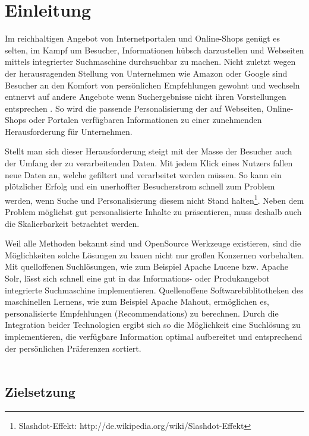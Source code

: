 \section{Einleitung}

Im reichhaltigen Angebot von Internetportalen und Online-Shops genügt es selten, im Kampf um Besucher, Informationen hübsch darzustellen und Webseiten mittels integrierter Suchmaschine durchsuchbar zu machen. Nicht zuletzt wegen der herausragenden Stellung von Unternehmen wie Amazon oder Google sind Besucher an den Komfort von persönlichen Empfehlungen gewohnt und wechseln entnervt auf andere Angebote wenn Suchergebnisse nicht ihren Vorstellungen entsprechen \citep[Kap 10]{hb,rs}. So wird die passende Personalisierung der auf Webseiten, Online-Shops oder Portalen verfügbaren Informationen zu einer zunehmenden Herausforderung für Unternehmen.

Stellt man sich dieser Herausforderung steigt mit der Masse der Besucher auch der Umfang der zu verarbeitenden Daten. Mit jedem Klick eines Nutzers fallen neue Daten an, welche gefiltert und verarbeitet werden müssen. So kann ein plötzlicher Erfolg und ein unerhoffter Besucherstrom schnell zum Problem werden, wenn Suche und Personalisierung diesem nicht Stand halten\footnote{Slashdot-Effekt: http://de.wikipedia.org/wiki/Slashdot-Effekt}. Neben dem Problem möglichst gut personalisierte Inhalte zu präsentieren, muss deshalb auch die Skalierbarkeit betrachtet werden.

Weil alle Methoden bekannt sind und OpenSource Werkzeuge existieren, sind die Möglichkeiten solche Lösungen zu bauen nicht nur großen Konzernen vorbehalten. Mit quelloffenen Suchlösungen, wie zum Beispiel Apache Lucene bzw. Apache Solr, lässt sich schnell eine gut in das Informations- oder Produkangebot integrierte Suchmaschine implementieren. Quellenoffene Softwarebiblitotheken des maschinellen Lernens, wie zum Beispiel Apache Mahout, ermöglichen es, personalisierte Empfehlungen (Recommendations) zu berechnen. Durch die Integration beider Technologien ergibt sich so die Möglichkeit eine Suchlösung zu implementieren, die verfügbare Information optimal aufbereitet und entsprechend der persönlichen Präferenzen sortiert. \\ \\

\subsection{Zielsetzung}

